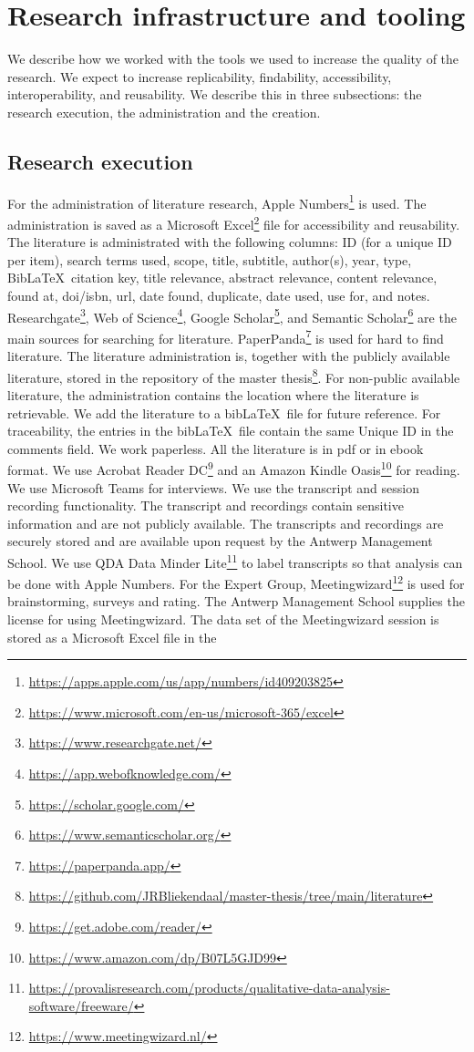 \section{Research infrastructure and tooling}
\label{sub:researchinfraandtooling}
We describe how we worked with the tools we used to increase the quality of the research. We expect to increase replicability, findability, accessibility, interoperability, and reusability. We describe this in three subsections: the research execution, the administration and the creation.
\subsection{Research execution}
\label{subsub:tbresearchexecution}
For the administration of literature research, Apple Numbers\footnote{\url{https://apps.apple.com/us/app/numbers/id409203825}} is used. The administration is saved as a Microsoft Excel\footnote{\url{https://www.microsoft.com/en-us/microsoft-365/excel}} file for accessibility and reusability. The literature is administrated with the following columns: ID (for a unique ID per item), search terms used, scope, title, subtitle, author(s), year, type, Bib\LaTeX\ citation key, title relevance, abstract relevance, content relevance, found at, doi/isbn, url, date found, duplicate, date used, use for, and notes. Researchgate\footnote{\url{https://www.researchgate.net/}}, Web of Science\footnote{\url{https://app.webofknowledge.com/}}, Google Scholar\footnote{\url{https://scholar.google.com/}}, and Semantic Scholar\footnote{\url{https://www.semanticscholar.org/}} are the main sources for searching for literature. PaperPanda\footnote{\url{https://paperpanda.app/}} is used for hard to find literature. The literature administration is, together with the publicly available literature, stored in the repository of the master thesis\footnote{\url{https://github.com/JRBliekendaal/master-thesis/tree/main/literature}}. For non-public available literature, the administration contains the location where the literature is retrievable. We add the literature to a bib\LaTeX\ file for future reference. For traceability, the entries in the bib\LaTeX\ file contain the same Unique ID in the comments field. We work paperless. All the literature is in pdf or in ebook format. We use Acrobat Reader DC\footnote{\url{https://get.adobe.com/reader/}} and an Amazon Kindle Oasis\footnote{\url{https://www.amazon.com/dp/B07L5GJD99}} for reading. We use Microsoft Teams for interviews. We use the transcript and session recording functionality. The transcript and recordings contain sensitive information and are not publicly available. The transcripts and recordings are securely stored and are available upon request by the Antwerp Management School. We use QDA Data Minder Lite\footnote{\url{https://provalisresearch.com/products/qualitative-data-analysis-software/freeware/}} to label transcripts so that analysis can be done with Apple Numbers. For the Expert Group, Meetingwizard\footnote{\url{https://www.meetingwizard.nl/}} is used for brainstorming, surveys and rating. The Antwerp Management School supplies the license for using Meetingwizard. The data set of the Meetingwizard session is stored as a Microsoft Excel file in the 
